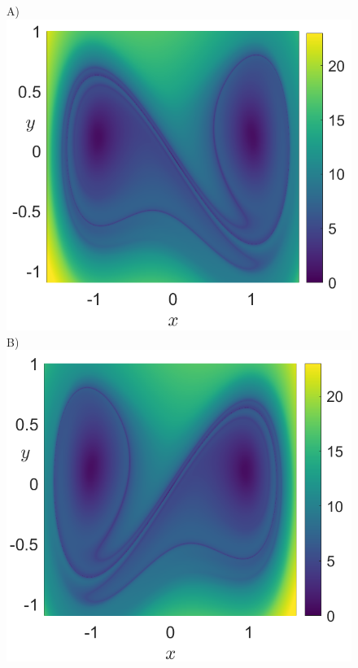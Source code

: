 \documentclass[8pt]{article}
\begin{document}
\begin{figure}[htbp]
	\begin{center}
		A)\includegraphics[scale=0.26]{duffing_stbl_tau_10_pert_01.png}
		B)\includegraphics[scale=0.26]{duffing_unstbl_tau_10_pert_01.png}

\end{center}
\end{figure}
\end{document}
